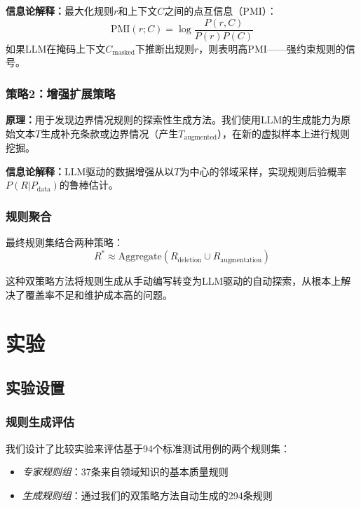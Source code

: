 \documentclass[runningheads]{llncs}
\begin{document}
\textbf{信息论解释：}最大化规则$r$和上下文$C$之间的点互信息（PMI）：
\begin{equation}
\text{PMI}(r; C) = \log \frac{P(r, C)}{P(r)P(C)}
\end{equation}
如果LLM在掩码上下文$C_{\text{masked}}$下推断出规则$r$，则表明高PMI——强约束规则的信号。

\subsubsection{策略2：增强扩展策略}

\textbf{原理：}用于发现边界情况规则的探索性生成方法。我们使用LLM的生成能力为原始文本$T$生成补充条款或边界情况（产生$T_{\text{augmented}}$），在新的虚拟样本上进行规则挖掘。

\textbf{信息论解释：}LLM驱动的数据增强从以$T$为中心的邻域采样，实现规则后验概率$P(R | P_{\text{data}})$的鲁棒估计。

\subsubsection{规则聚合}
最终规则集结合两种策略：
\begin{equation}
R^* \approx \text{Aggregate}(R_{\text{deletion}} \cup R_{\text{augmentation}})
\end{equation}

这种双策略方法将规则生成从手动编写转变为LLM驱动的自动探索，从根本上解决了覆盖率不足和维护成本高的问题。

\section{实验}

\subsection{实验设置}

\subsubsection{规则生成评估}
我们设计了比较实验来评估基于94个标准测试用例的两个规则集：
\begin{itemize}
    \item \textit{专家规则组}：37条来自领域知识的基本质量规则
    \item \textit{生成规则组}：通过我们的双策略方法自动生成的294条规则
\end{itemize}
\end{document}
